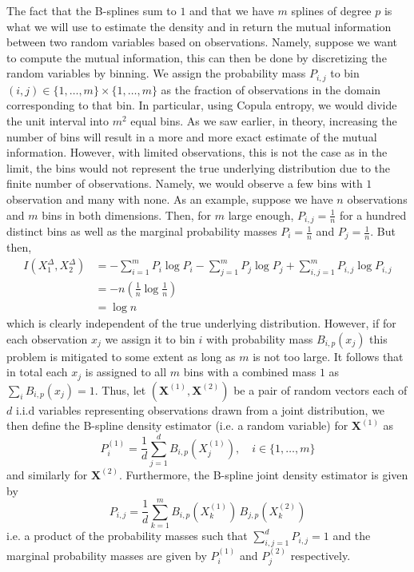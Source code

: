 \documentclass[../Thesis.tex]{subfiles}
\begin{document}
The fact that the B-splines sum to $1$ and that we have $m$ splines of degree $p$ is what we will use to estimate the density and in return the mutual information between two random variables based on observations. Namely, suppose we want to compute the mutual information, this can then be done by discretizing the random variables by binning. We assign the probability mass $P_{i,j}$ to bin $(i,j)\in \{1,\dots, m\} \times \{1,\dots, m\}$ as the fraction of observations in the domain corresponding to that bin. In particular, using Copula entropy, we would divide the unit interval into $m^2$ equal bins. As we saw earlier, in theory, increasing the number of bins will result in a more and more exact estimate of the mutual information. However, with limited observations, this is not the case as in the limit, the bins would not represent the true underlying distribution due to the finite number of observations. Namely, we would observe a few bins with $1$ observation and many with none. As an example, suppose we have $n$ observations and $m$ bins in both dimensions. Then, for $m$ large enough, $P_{i,j} = \frac{1}{n}$ for a hundred distinct bins as well as the marginal probability masses $P_i = \frac{1}{n}$ and $P_j = \frac{1}{n}$. But then,
\begin{align*}
    I\left(X_1^\Delta,X_2^\Delta\right) & = - \sum_{i=1}^{m} P_i \log P_i - \sum_{j=1}^{m} P_j \log P_j + \sum_{i,j = 1}^{m} P_{i,j} \log P_{i,j} \\
                                        & = - n \left(\frac{1}{n} \log \frac{1}{n}\right)                                                         \\
                                        & = \log n
\end{align*}
which is clearly independent of the true underlying distribution. However, if for each observation $x_j$ we assign it to bin $i$ with probability mass $B_{i,p}\left(x_j\right)$ this problem is mitigated to some extent as long as $m$ is not too large. It follows that in total each $x_j$ is assigned to all $m$ bins with a combined mass $1$ as $\sum_i B_{i,p} ( x_j ) = 1$. Thus, let $\left(\boldsymbol X^{(1)}, \boldsymbol X^{(2)}\right)$ be a pair of random vectors each of $d$ i.i.d variables representing observations drawn from a joint distribution, we then define the B-spline density estimator (i.e. a random variable) for $\boldsymbol X^{(1)}$ as 
$$P_{i}^{(1)} = \frac{1}{d} \sum_{j = 1}^{d} B_{i,p}\left(X_{j}^{(1)}\right), \quad i\in \{1,\dots, m\}$$
and similarly for $\boldsymbol X^{(2)}$. Furthermore, the B-spline joint density estimator is given by 
$$P_{i,j} = \frac{1}{d} \sum_{k= 1}^{m} B_{i,p}\left(X^{(1)}_k\right) \, B_{j,p}\left(X^{(2)}_k\right)$$
i.e. a product of the probability masses such that $\sum_{i,j = 1}^d P_{i,j} = 1$ and the marginal probability masses are given by $P_{i}^{(1)}$ and $P_{j}^{(2)}$ respectively.
\end{document}
